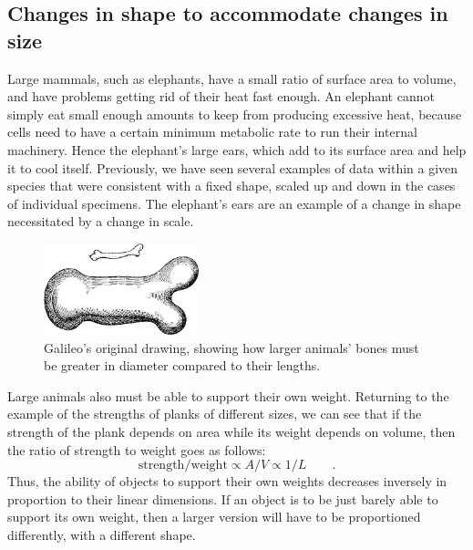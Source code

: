 \subsection{Changes in shape to accommodate changes in size}


Large mammals, such as elephants, have a
small ratio of surface area to volume, and have problems
getting rid of their heat fast enough. An elephant cannot
simply eat small enough amounts to keep from producing
excessive heat, because cells need to have a certain minimum
metabolic rate to run their internal machinery. Hence the
elephant's large ears, which add to its surface area and
help it to cool itself. Previously, we have seen several
examples of data within a given species that were consistent
with a fixed shape, scaled up and down in the cases of
individual specimens. The elephant's ears are an example of
a change in shape necessitated by a change in scale.

\begin{figure}[ht] 
\begin{center}
\includegraphics[width=0.4\textwidth]{./scaling/figs/galileo-bones}
\caption{ \qquad  Galileo's original drawing, showing
 how larger animals' bones must be
 greater in diameter compared to their
 lengths.
 }
\end{center}
\end{figure}


\vspace{1.5mm}
Large animals also must be able to support their own weight.
Returning to the example of the strengths of planks of
different sizes, we can see that if the strength of the
plank depends on area while its weight depends on volume,
then the ratio of strength to weight goes as follows:
\begin{equation*}
 \text{strength}/\text{weight} \propto A/V \propto 1/L \qquad .
\end{equation*}
Thus, the ability of objects to support their own weights
decreases inversely in proportion to their linear dimensions.
If an object is to be just barely able to support its own
weight, then a larger version will have to be proportioned
differently, with a different shape.

